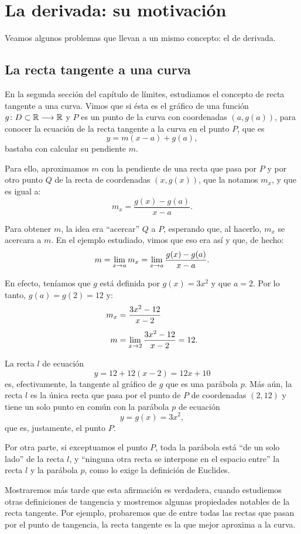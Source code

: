 \chapter{La derivada: su motivación}

Veamos algunos problemas que llevan a un mismo concepto: el de derivada.

\section{La recta tangente a una curva}
En la segunda sección del capítulo de límites, estudiamos
el concepto de recta tangente a una curva. Vimos que si ésta es el gráfico de una función
$\funcjc{g}{D\subset\mathbb{R}}{\mathbb{R}}$ y $P$ es un punto de la curva con coordenadas
$(a,g(a))$, para conocer la ecuación de la recta tangente a la curva en el punto $P$, que es
\[
y = m(x - a) + g(a),
\]
bastaba con calcular su pendiente $m$.

Para ello, aproximamos $m$ con la pendiente de una recta que pasa por $P$ y por otro punto $Q$ de
la recta de coordenadas $(x,g(x))$, que la notamos $m_x$, y que es igual a:
\[
m_x = \frac{g(x) - g(a)}{x - a}.
\]

Para obtener $m$, la idea era ``acercar'' $Q$ a $P$, esperando que, al hacerlo, $m_x$ se acercara a
$m$. En el ejemplo estudiado, vimos que eso era así y que, de hecho:
\[
m = \limjc{m_x}{x}{a} = \limjc{\frac{g(x) - g(a)}{x - a}}{x}{a}.
\]

En efecto, teníamos que $g$ está definida por $g(x) = 3x^2$ y que $a = 2$. Por lo tanto, $g(a) =
g(2) = 12$ y:
\begin{align*}
m_x &= \frac{3x^2 - 12}{x - 2} \\[4pt]
m &= \limjc{\frac{3x^2 - 12}{x - 2}}{x}{2} = 12.
\end{align*}

La recta $l$ de ecuación
\[
y = 12 + 12(x - 2) = 12x + 10
\]
es, efectivamente, la tangente al gráfico de $g$ que es una parábola $p$. Más aún, la recta $l$ es
la única recta que pasa por el punto de $P$ de coordenadas $(2,12)$ y tiene un solo punto en común
con la parábola $p$ de ecuación
\[
y = g(x) = 3x^2,
\]
que es, justamente, el punto $P$.

Por otra parte, si exceptuamos el punto $P$, toda la parábola está ``de un solo lado'' de la recta
$l$, y ``ninguna otra recta se interpone en el espacio entre'' la recta $l$ y la parábola $p$, como
lo exige la definición de Euclides.

Mostraremos más tarde que esta afirmación es verdadera, cuando estudiemos otras definiciones de
tangencia y mostremos algunas propiedades notables de la recta tangente. Por ejemplo, probaremos
que de entre todas las rectas que pasan por el punto de tangencia, la recta tangente es la que
mejor aproxima a la curva.

